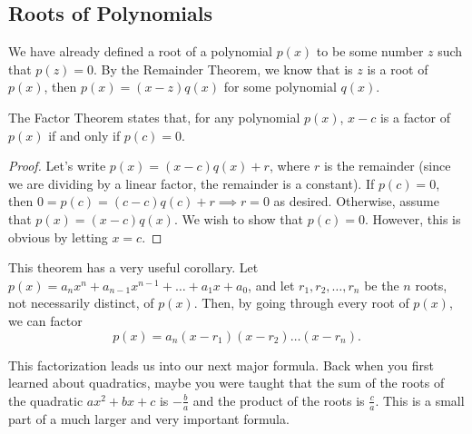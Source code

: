\documentclass[12pt]{article}
\begin{document}
\subsection{Roots of Polynomials}
We have already defined a root of a polynomial $p(x)$ to be some number $z$ such that $p(z)=0$. By the Remainder Theorem, we know that is $z$ is a root of $p(x)$, then $p(x)= (x-z)q(x)$ for some polynomial $q(x)$.
\begin{tcolorbox}[colback=blue!10!white, colframe=blue!50!black, title=The Factor Theorem]
    The Factor Theorem states that, for any polynomial $p(x)$, $x-c$ is a factor of $p(x)$ if and only if $p(c)=0$. 
    \begin{proof}
        Let's write $p(x)=(x-c)q(x)+r$, where $r$ is the remainder (since we are dividing by a linear factor, the remainder is a constant). If $p(c)=0$, then $0=p(c)=(c-c)q(c)+r\implies r=0$ as desired. Otherwise, assume that $p(x)=(x-c)q(x)$. We wish to show that $p(c)=0$. However, this is obvious by letting $x=c$. 
    \end{proof}
    \tcblower
        This theorem has a very useful corollary. Let $p(x)=a_nx^n+a_{n-1}x^{n-1}+\dots+a_1x+a_0$, and let $r_1,r_2,\dots,r_n$ be the $n$ roots, not necessarily distinct, of $p(x)$. Then, by going through every root of $p(x)$, we can factor 
        \[
            p(x)=a_n(x-r_1)(x-r_2)\dots(x-r_n).
        \]
\end{tcolorbox}
This factorization leads us into our next major formula. Back when you first learned about quadratics, maybe you were taught that the sum of the roots of the quadratic $ax^2+bx+c$ is $-\frac{b}{a}$ and the product of the roots is $\frac{c}{a}$. This is a small part of a much larger and very important formula.
\end{document}
